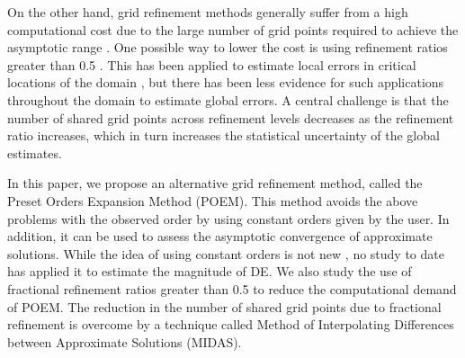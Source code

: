 On the other hand, grid refinement methods generally suffer from a high computational cost due to the large number of grid points required to achieve the asymptotic range \citep{Eca2018}. One possible way to lower the cost is using refinement ratios greater than 0.5 \citep{Roy2010}. This has been applied to estimate local errors in critical locations of the domain \citep{Roache1994Perspective:Studies,Trivedi2019}, but there has been less evidence for such applications throughout the domain to estimate global errors. A central challenge is that the number of shared grid points across refinement levels decreases as the refinement ratio increases, which in turn increases the statistical uncertainty of the global estimates.

In this paper, we propose an alternative grid refinement method, called the Preset Orders Expansion Method (POEM). This method avoids the above problems with the observed order by using constant orders given by the user. In addition, it can be used to assess the asymptotic convergence of approximate solutions. While the idea of using constant orders is not new \citep{Eca2002}, no study to date has applied it to estimate the magnitude of DE. We also study the use of fractional refinement ratios greater than 0.5 to reduce the computational demand of POEM. The reduction in the number of shared grid points due to fractional refinement is overcome by a technique called Method of Interpolating Differences between Approximate Solutions (MIDAS).

